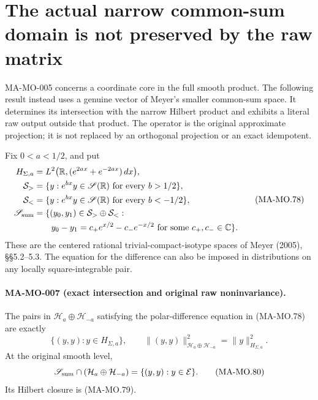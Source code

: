 \section{The actual narrow common-sum domain is not preserved by the raw matrix}
\label{sec:smaller-sum-noninvariance}

MA-MO-005 concerns a coordinate core in the full smooth product.
The following result instead uses a genuine vector of Meyer's smaller
common-sum space. It determines its intersection with the narrow
Hilbert product and exhibits a literal raw output outside that product.
The operator is the original approximate projection; it is not replaced
by an orthogonal projection or an exact idempotent.

Fix \(0<a<1/2\), and put
\[
 \begin{aligned}
 H_{\Sigma,a}&=L^2\bigl(\mathbb R,
                         (e^{2ax}+e^{-2ax})\,dx\bigr),\\
 \mathcal S_>&=\{y:e^{bx}y\in\mathscr S(\mathbb R)
                                      \text{ for every }b>1/2\},\\
 \mathcal S_<&=\{y:e^{bx}y\in\mathscr S(\mathbb R)
                                      \text{ for every }b<-1/2\},\\
 \mathscr S_{\rm sum}
   &=\{(y_0,y_1)\in\mathcal S_>\oplus\mathcal S_<:\\
   &\hspace{2em}y_0-y_1=c_+e^{x/2}-c_-e^{-x/2}
                     \text{ for some }c_+,c_-\in\mathbb C\}.
 \end{aligned}
 \tag{MA-MO.78}
\]
These are the centered rational trivial-compact-isotype spaces of
Meyer (2005), \S\S5.2--5.3. The equation for the difference can also
be imposed in distributions on any locally square-integrable pair.

\paragraph{MA-MO-007 (exact intersection and original raw noninvariance).}
The pairs in \(\mathcal H_a\oplus\mathcal H_{-a}\) satisfying the
polar-difference equation in (MA-MO.78) are exactly
\[
 \{(y,y):y\in H_{\Sigma,a}\},\qquad
 \|(y,y)\|_{\mathcal H_a\oplus\mathcal H_{-a}}^2
                         =\|y\|_{H_{\Sigma,a}}^2.
 \tag{MA-MO.79}
\]
At the original smooth level,
\[
 \mathscr S_{\rm sum}\cap(\mathcal H_a\oplus\mathcal H_{-a})
                          =\{(y,y):y\in\mathcal E\}.
 \tag{MA-MO.80}
\]
Its Hilbert closure is (MA-MO.79).

